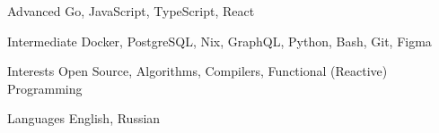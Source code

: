 
\begin{cvskills}

  \cvskill
    {Advanced}
    {Go, JavaScript, TypeScript, React}

    \cvskill
    {Intermediate}
    {Docker, PostgreSQL, Nix, GraphQL, Python, Bash, Git, Figma}

   \cvskill
    {Interests}
    {Open Source, Algorithms, Compilers, Functional (Reactive) Programming}

  \cvskill
    {Languages}
    {English, Russian}

\end{cvskills}